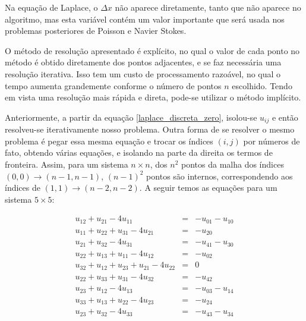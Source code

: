 \documentclass[journal]{IEEEtran}
\begin{document}
Na equação de Laplace, o $\Delta x$ não aparece diretamente, tanto que não aparece no algoritmo, mas esta variável contém um valor importante que será usada nos problemas posteriores de Poisson e Navier Stokes.

O método de resolução apresentado é explícito, no qual o valor de cada ponto no método é obtido diretamente dos pontos adjacentes, e se faz necessária uma resolução iterativa. Isso tem um custo de processamento razoável, no qual o tempo aumenta grandemente conforme o número de pontos $n$ escolhido. Tendo em vista uma resolução mais rápida e direta, pode-se utilizar o método implícito.

Anteriormente, a partir da equação \ref{laplace_discreta_zero}, isolou-se $u_{ij}$ e então resolveu-se iterativamente nosso problema. Outra forma de se resolver o mesmo problema é pegar essa mesma equação e trocar os índices $(i,j)$ por números de fato, obtendo várias equações, e isolando na parte da direita os termos de fronteira. Assim, para um sistema $n\times n$, dos $n^2$ pontos da malha dos índices $(0,0)\rightarrow (n-1,n-1)$, $(n-1)^2$ pontos são internos, correspondendo aos índices de $(1,1)\rightarrow (n-2,n-2)$. A seguir temos as equações para um sistema $5\times 5$:

\begin{eqnarray}
u_{12}+u_{21} -4u_{11}& = & -u_{01}-u_{10} \nonumber \\
u_{11}+u_{22}+u_{31}-4u_{21}& =& -u_{20} \nonumber \\
u_{21}+u_{32}-4u_{31}&=&-u_{41}-u_{30} \nonumber \\
u_{22}+u_{13}+u_{11}-4u_{12}&=&-u_{02} \nonumber \\
u_{32}+u_{12}+u_{23}+u_{21}-4u_{22}&=&0 \nonumber \\
u_{22}+u_{33}+u_{31}-4u_{32}&=&-u_{42} \nonumber \\
u_{23}+u_{12}-4u_{13}&=&-u_{03}-u_{14} \nonumber \\
u_{33}+u_{13}+u_{22}-4u_{23}&=&-u_{24} \nonumber \\
u_{23}+u_{32}-4u_{33}&=&-u_{43}-u_{34} \nonumber
\end{eqnarray}
\end{document}
